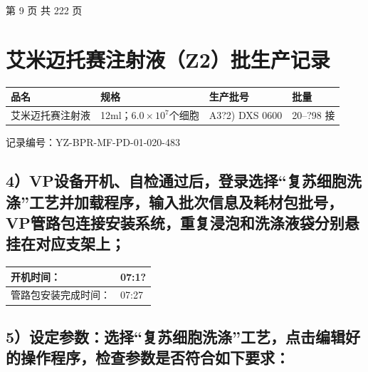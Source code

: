 \documentclass[UTF8,10pt,a4paper,fontset=fandol]{ctexart}
\newcommand{\fieldvalue}[1]{#1}
\newcommand{\handwritten}[1]{#1}
\begin{document}
\vfill

\begin{center}
第 9 页 共 222 页
\end{center}

\newpage

\section*{艾米迈托赛注射液（Z2）批生产记录}

\begin{center}
\begin{tabularx}{\textwidth}{|>{\centering\arraybackslash}X|>{\centering\arraybackslash}X|>{\centering\arraybackslash}X|>{\centering\arraybackslash}X|}
\hline
品名 & 规格 & 生产批号 & 批量 \\
\hline
艾米迈托赛注射液 & 12ml；$6.0\times10^{7}$个细胞 &
\fieldvalue{\handwritten{A3?2) DXS 0600}} &
\fieldvalue{\handwritten{20--?98 接}} \\
\hline
\end{tabularx}
\end{center}

记录编号：YZ-BPR-MF-PD-01-020-483

\subsection*{4）VP设备开机、自检通过后，登录选择“复苏细胞洗涤”工艺并加载程序，输入批次信息及耗材包批号，VP管路包连接安装系统，重复浸泡和洗涤液袋分别悬挂在对应支架上；}

\begin{flushright}
\begin{tabular}{|p{}|p{}|}
\hline
开机时间： &
\fieldvalue{\handwritten{07:1?}} \\ \hline
管路包安装完成时间： &
\fieldvalue{\handwritten{07:27}} \\ \hline
\end{tabular}
\end{flushright}

\subsection*{5）设定参数：选择“复苏细胞洗涤”工艺，点击编辑好的操作程序，检查参数是否符合如下要求：}
\end{document}
